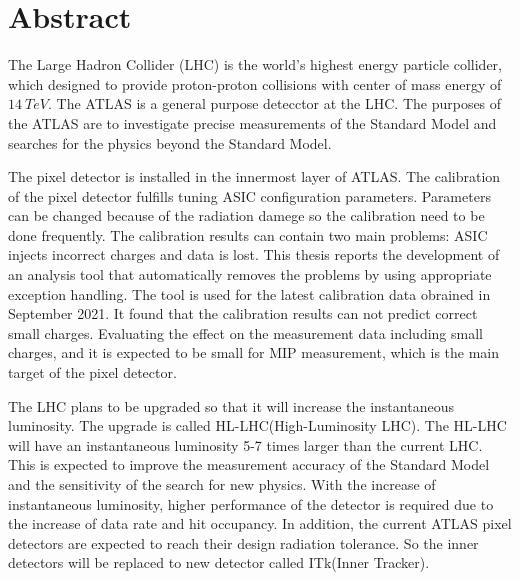 \chapter*{Abstract}

The Large Hadron Collider (LHC) is the world's highest energy particle collider, which designed to provide proton-proton collisions with center of mass energy of $14\ \si{TeV}$. The ATLAS is a general purpose detecctor at the LHC. The purposes of the ATLAS are to investigate precise measurements of the Standard Model and searches for the physics beyond the Standard Model.

The pixel detector is installed in the innermost layer of ATLAS.
The calibration of the pixel detector fulfills tuning ASIC configuration parameters.
Parameters can be changed because of the radiation damege so the calibration need to be done frequently.
The calibration results can contain two main problems: ASIC injects incorrect charges and data is lost.
This thesis reports the development of an analysis tool that automatically removes the problems by using appropriate exception handling.
The tool is used for the latest calibration data obrained in September 2021. It found that the calibration results can not predict correct small charges.
Evaluating the effect on the measurement data including small charges, and it is expected to be small for MIP measurement, which is the main target of the pixel detector.

The LHC plans to be upgraded so that it will increase the instantaneous luminosity. The upgrade is called HL-LHC(High-Luminosity LHC).
The HL-LHC will have an instantaneous luminosity 5-7 times larger than the current LHC.
This is expected to improve the measurement accuracy of the Standard Model and the sensitivity of the search for new physics.
With the increase of instantaneous luminosity, higher performance of the detector is required due to the increase of data rate and hit occupancy.
In addition, the current ATLAS pixel detectors are expected to reach their design radiation tolerance.
So the inner detectors will be replaced to new detector called ITk(Inner Tracker).

